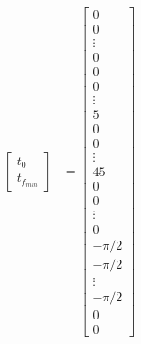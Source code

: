 \documentclass[11pt,usenames]{article}
\begin{document}
\begin{align}
\begin{bmatrix}
	t_{0} \\ 
	t_{f_{min}}  
	\end{bmatrix}
	&=
	\begin{bmatrix}
	0 \\ 0 \\ \vdots \\  0 \\  
	0 \\ 0 \\ \vdots \\  5 \\ 
	0 \\ 0 \\ \vdots \\  45 \\ 
	0 \\ 0 \\ \vdots \\  0 \\ 
	-\pi /2 \\ -\pi /2 \\ \vdots \\  -\pi /2 \\ 
	0 \\ 
	0  
	\end{bmatrix}
	\end{align}
	
\end{document}
